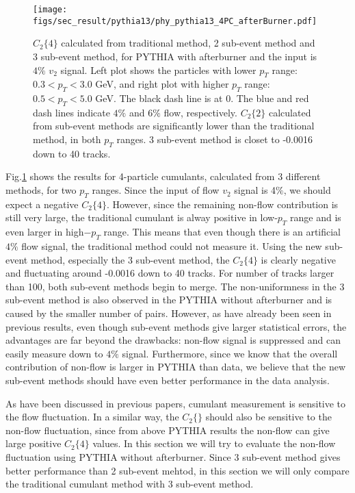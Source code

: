 \begin{figure}[H]
\centering
\texttt{[image: figs/sec\_result/pythia13/phy\_pythia13\_4PC\_afterBurner.pdf]}
\caption{$C_{2}\{4\}$ calculated from traditional method, 2 sub-event method and 3 sub-event method, for PYTHIA with afterburner and the input is $4\%$ $v_{2}$ signal. Left plot shows the particles with lower $p_{T}$ range: $0.3<p_{T}<3.0$ GeV, and right plot with higher $p_{T}$ range: $0.5<p_{T}<5.0$ GeV. The black dash line is at 0. The blue and red dash lines indicate $4\%$ and $6\%$ flow, respectively. $C_{2}\{2\}$ calculated from sub-event methods are significantly lower than the traditional method, in both $p_{T}$ ranges. 3 sub-event method is closet to -0.0016 down to 40 tracks.}
\label{fig:phy_pythia13_4PC_afterBurner}
\end{figure}

Fig.\ref{fig:phy_pythia13_4PC_afterBurner} shows the results for 4-particle cumulants, calculated from 3 different methods, for two $p_{T}$ ranges. Since the input of flow $v_{2}$ signal is 4$\%$, we should expect a negative $C_{2}\{4\}$. However, since the remaining non-flow contribution is still very large, the traditional cumulant is alway positive in low-$p_{T}$ range and is even larger in high$-p_{T}$ range. This means that even though there is an artificial $4\%$ flow signal, the traditional method could not measure it. Using the new sub-event method, especially the 3 sub-event method, the $C_{2}\{4\}$ is clearly negative and fluctuating around -0.0016 down to 40 tracks. For number of tracks larger than 100, both sub-event methods begin to merge. The non-uniformness in the 3 sub-event method is also observed in the PYTHIA without afterburner and is caused by the smaller number of pairs. However, as have already been seen in previous results, even though sub-event methods give larger statistical errors, the advantages are far beyond the drawbacks: non-flow signal is suppressed and can easily measure down to $4\%$ signal. Furthermore, since we know that the overall contribution of non-flow is larger in PYTHIA than data, we believe that the new sub-event methods should have even better performance in the data analysis.

As have been discussed in previous papers, cumulant measurement is sensitive to the flow fluctuation. In a similar way, the $C_{2}\{\}$ should also be sensitive to the non-flow fluctuation, since from above PYTHIA results the non-flow can give large positive $C_{2}\{4\}$ values. In this section we will try to evaluate the non-flow fluctuation using PYTHIA without afterburner. Since 3 sub-event method gives better performance than 2 sub-event mehtod, in this section we will only compare the traditional cumulant method with 3 sub-event method.

